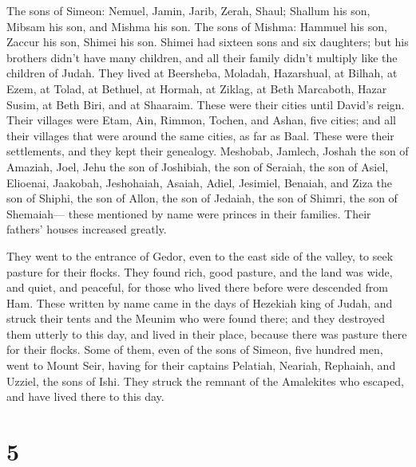  The sons of Simeon: Nemuel, Jamin, Jarib, Zerah, Shaul;
 Shallum his son, Mibsam his son, and Mishma his son.
 The sons of Mishma: Hammuel his son, Zaccur his son,
Shimei his son.  Shimei had sixteen sons and six
daughters; but his brothers didn't have many children, and all their
family didn't multiply like the children of Judah.  They
lived at Beersheba, Moladah, Hazarshual,  at Bilhah, at
Ezem, at Tolad,  at Bethuel, at Hormah, at Ziklag,
 at Beth Marcaboth, Hazar Susim, at Beth Biri, and at
Shaaraim. These were their cities until David's reign. 
Their villages were Etam, Ain, Rimmon, Tochen, and Ashan, five cities;
 and all their villages that were around the same cities,
as far as Baal. These were their settlements, and they kept their
genealogy.  Meshobab, Jamlech, Joshah the son of Amaziah,
 Joel, Jehu the son of Joshibiah, the son of Seraiah, the
son of Asiel,  Elioenai, Jaakobah, Jeshohaiah, Asaiah,
Adiel, Jesimiel, Benaiah,  and Ziza the son of Shiphi,
the son of Allon, the son of Jedaiah, the son of Shimri, the son of
Shemaiah---  these mentioned by name were princes in
their families. Their fathers' houses increased greatly.

 They went to the entrance of Gedor, even to the east
side of the valley, to seek pasture for their flocks. 
They found rich, good pasture, and the land was wide, and quiet, and
peaceful, for those who lived there before were descended from Ham.
 These written by name came in the days of Hezekiah king
of Judah, and struck their tents and the Meunim who were found there;
and they destroyed them utterly to this day, and lived in their place,
because there was pasture there for their flocks.  Some
of them, even of the sons of Simeon, five hundred men, went to Mount
Seir, having for their captains Pelatiah, Neariah, Rephaiah, and Uzziel,
the sons of Ishi.  They struck the remnant of the
Amalekites who escaped, and have lived there to this day.

\hypertarget{section-4}{%
\section{5}\label{section-4}}

